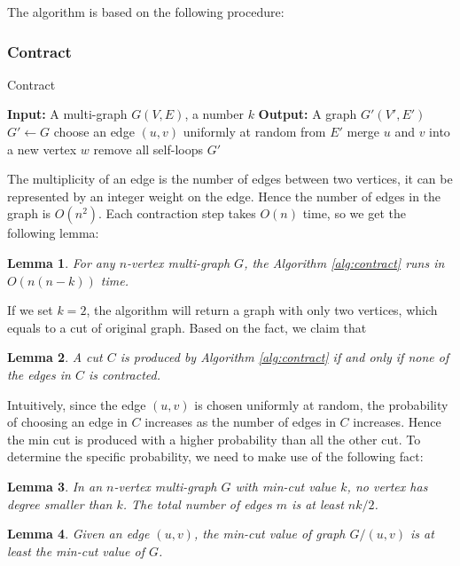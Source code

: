 \documentclass[12pt]{article}
\newtheorem{lemma}{Lemma}
\begin{document}
The algorithm is based on the following procedure:
\subsubsection{Contract}
\begin{algorithm}
\caption{Contract}
\label{alg:contract}
\begin{algorithmic}
    \STATE \textbf{Input:} A multi-graph $G(V,E)$, a number $k$
    \STATE \textbf{Output:} A graph $G'(V',E')$
    \STATE $G'\leftarrow G$
    \STATE choose an edge $(u,v)$ uniformly at random from $E'$
    \STATE merge $u$ and $v$ into a new vertex $w$
    \STATE remove all self-loops
    \ENDWHILE
    \RETURN $G'$
\end{algorithmic}
\end{algorithm}
The multiplicity of an edge is the number of edges between two vertices, it can be represented by an integer weight on the edge. Hence the number of edges in the graph is $O(n^2)$. Each contraction step takes $O(n)$ time, so we get the following lemma:

\begin{lemma}
    \label{lemma:9}
    For any $n$-vertex multi-graph $G$, the Algorithm \ref{alg:contract} runs in $O(n(n-k))$ time.
\end{lemma}

If we set $k=2$, the algorithm will return a graph with only two vertices, which equals to a cut of original graph. Based on the fact, we claim that

\begin{lemma}
    \label{lemma:cut}
    A cut $C$ is produced by Algorithm \ref{alg:contract} if and only if none of the edges in $C$ is contracted.
\end{lemma}

Intuitively, since the edge $(u,v)$ is chosen uniformly at random, the probability of choosing an edge in $C$ increases as the number of edges in $C$ increases. Hence the min cut is produced with a higher probability than all the other cut. To determine the specific probability, we need to make use of the following fact:

\begin{lemma}
    \label{lemma:degree}
    In an $n$-vertex multi-graph $G$ with min-cut value $k$, no vertex has degree smaller than $k$. The total number of edges $m$ is at least $nk/2$.
\end{lemma}

\begin{lemma}
    \label{lemma:contract}
    Given an edge $(u,v)$, the min-cut value of graph $G/(u,v)$ is at least the min-cut value of $G$.
\end{lemma}
\end{document}
